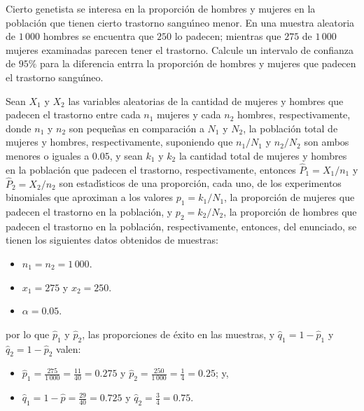 \begin{enunciado}
 Cierto genetista se interesa en la proporci\'on de hombres y mujeres en la poblaci\'on que tienen cierto trastorno sangu\'{\i}neo menor. En una muestra aleatoria de $1\,000$ hombres se encuentra que $250$ lo padecen; mientras que $275$ de $1\,000$ mujeres examinadas parecen tener el trastorno. Calcule un intervalo de confianza de $95\%$ para la diferencia entrra la proporci\'on de hombres y mujeres que padecen el trastorno sangu\'{\i}neo.
\end{enunciado}

\begin{solucion}
 Sean $X_1$ y $X_2$ las variables aleatorias de la cantidad de mujeres y hombres que padecen el trastorno entre cada $n_1$ mujeres y cada $n_2$ hombres, respectivamente, donde $n_1$ y $n_2$ son peque\~nas en comparaci\'on a $N_1$ y $N_2$, la poblaci\'on total de mujeres y hombres, respectivamente, suponiendo que $n_1/N_1$ y $n_2/N_2$ son ambos menores o iguales a $0.05$, y sean $k_1$ y $k_2$ la cantidad total de mujeres y hombres en la poblaci\'on que padecen el trastorno, respectivamente, entonces $\widehat{P}_1 = X_1/n_1$ y $\widehat{P}_2 = X_2/n_2$ son estad\'{\i}sticos de una proporci\'on, cada uno, de los experimentos binomiales que aproximan a los valores $p_1=k_1/N_1$, la proporci\'on de mujeres que padecen el trastorno en la poblaci\'on, y $p_2=k_2/N_2$, la proporci\'on de hombres que padecen el trastorno en la poblaci\'on, respectivamente, entonces, del enunciado, se tienen los siguientes datos obtenidos de muestras:
 \begin{itemize}
  \item $n_1 = n_2 = 1\,000$.
  \item $x_1 = 275$ y $x_2 = 250$.
  \item $\alpha = 0.05$.
 \end{itemize}
 por lo que $\hat{p}_1$ y $\hat{p}_2$, las proporciones de \'exito en las muestras, y $\hat{q}_1 = 1 - \hat{p}_1$ y $\hat{q}_2 = 1 - \hat{p}_2$ valen:
 \begin{itemize}
  \item $\hat{p}_1 = \frac{275}{1\,000} = \frac{11}{40} = 0.275$ y $\hat{p}_2 = \frac{250}{1\,000} = \frac{1}{4} = 0.25$; y,
  \item $\hat{q}_1 = 1- \hat{p} = \frac{29}{40} = 0.725$ y $\hat{q}_2 = \frac{3}{4} = 0.75$.
 \end{itemize}


\end{solucion}
